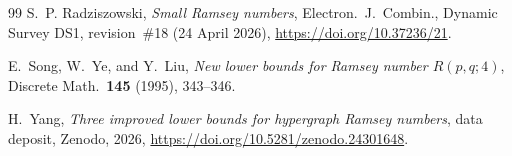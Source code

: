 \documentclass[11pt]{article}
\theoremstyle{remark}
\begin{document}
\begin{thebibliography}{99}
S.~P. Radziszowski,
\emph{Small Ramsey numbers},
Electron.\ J.\ Combin., Dynamic Survey DS1, revision~\#18 (24 April 2026),
\url{https://doi.org/10.37236/21}.

E.~Song, W.~Ye, and Y.~Liu,
\emph{New lower bounds for Ramsey number $R(p,q;4)$},
Discrete Math.\ \textbf{145} (1995), 343--346.

H.~Yang,
\emph{Three improved lower bounds for hypergraph Ramsey numbers},
data deposit, Zenodo, 2026,
\url{https://doi.org/10.5281/zenodo.24301648}.

\end{thebibliography}
\end{document}
